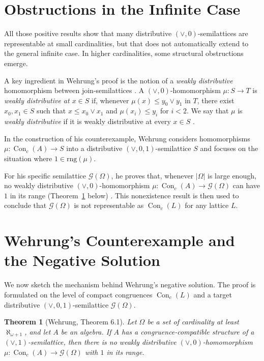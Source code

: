 ﻿\documentclass{article}
\newtheorem{theorem}{Theorem}[section]
\begin{document}
\section{Obstructions in the Infinite Case}

All those positive results show that many distributive $(\vee,0)$-semilattices
are representable at small cardinalities, but that does not automatically extend
to the general infinite case. In higher cardinalities, some structural obstructions emerge.

A key ingredient in Wehrung's proof is the notion of a \emph{weakly distributive}
homomorphism between join-semilattices \cite{Wehrung2007AdvMath}.
A $(\vee,0)$-homomorphism $\mu:S\to T$ is \emph{weakly distributive at $x\in S$} if,
whenever $\mu(x)\leq y_0\vee y_1$ in $T$, there exist $x_0,x_1\in S$ such that
$x\leq x_0\vee x_1$ and $\mu(x_i)\leq y_i$ for $i<2$.
We say that $\mu$ is \emph{weakly distributive} if it is weakly distributive at every $x\in S$
\cite{Wehrung2007AdvMath}.

In the construction of his counterexample, Wehrung considers homomorphisms
$\mu:\operatorname{Con}_c(A)\to S$ into a distributive $(\vee,0,1)$-semilattice $S$
and focuses on the situation where $1\in\mathrm{rng}(\mu)$.

For his specific semilattice $\mathcal{G}(\Omega)$, he proves that, whenever $|\Omega|$ is large enough,
no weakly distributive $(\vee,0)$-homomorphism
$\mu:\operatorname{Con}_c(A)\to \mathcal{G}(\Omega)$ can have $1$ in its range
(Theorem~\ref{thm:wehrung-6-1} below) \cite{Wehrung2007AdvMath}.
This nonexistence result is then used to conclude that $\mathcal{G}(\Omega)$ is not representable
as $\operatorname{Con}_c(L)$ for any lattice $L$.

\section{Wehrung's Counterexample and the Negative Solution}
\label{sec:negative}

We now sketch the mechanism behind Wehrung’s negative solution.
The proof is formulated on the level of compact congruences $\operatorname{Con}_c(L)$ and a target
distributive $(\vee,0,1)$-semilattice $\mathcal{G}(\Omega)$.

\begin{theorem}[Wehrung, Theorem 6.1]
\label{thm:wehrung-6-1}
Let $\Omega$ be a set of cardinality at least $\aleph_{\omega+1}$, and let $A$ be an algebra.
If $A$ has a congruence-compatible structure of a $(\vee,1)$-semilattice, then there is no
weakly distributive $(\vee,0)$-homomorphism
$\mu:\operatorname{Con}_c(A)\to \mathcal{G}(\Omega)$
with $1$ in its range.
\end{theorem}
\end{document}

